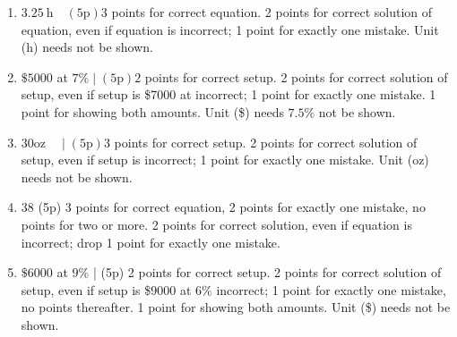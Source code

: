 \documentclass{ximera}
\begin{document}
\begin{enumerate}
  \item $3.25 \mathrm{~h} \quad(5 \mathrm{p}) 3$ points for correct equation. 2 points for correct solution of equation, even if equation is incorrect; 1 point for exactly one mistake. Unit (h) needs not be shown.
  \item $\$ 5000$ at $7 \% \mid(5 \mathrm{p}) 2$ points for correct setup. 2 points for correct solution of setup, even if setup is \$7000 at incorrect; 1 point for exactly one mistake. 1 point for showing both amounts. Unit (\$) needs $7.5 \%$ not be shown.
  \item $30 \mathrm{oz} \quad \mid(5 \mathrm{p}) 3$ points for correct setup. 2 points for correct solution of setup, even if setup is incorrect; 1 point for exactly one mistake. Unit (oz) needs not be shown.
  \item 38 (5p) 3 points for correct equation, 2 points for exactly one mistake, no points for two or more. 2 points for correct solution, even if equation is incorrect; drop 1 point for exactly one mistake.
  \item $\$ 6000$ at $9 \%$ | (5p) 2 points for correct setup. 2 points for correct solution of setup, even if setup is \$9000 at $6 \%$ incorrect; 1 point for exactly one mistake, no points thereafter. 1 point for showing both amounts. Unit (\$) needs not be shown.
\end{enumerate}
\end{document}
